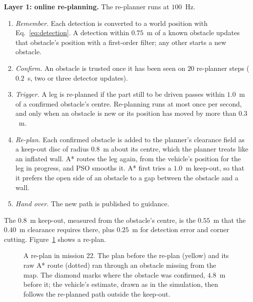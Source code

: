 \textbf{Layer 1: online re-planning.} The re-planner runs at $100$~Hz.
\begin{enumerate}
    \item \textit{Remember.} Each detection is converted to a world
    position with Eq.~\eqref{eq:detection}. A detection within $0.75$~m
    of a known obstacle updates that obstacle's position with a
    first-order filter; any other starts a new obstacle.
    \item \textit{Confirm.} An obstacle is trusted once it has been
    seen on $20$ re-planner steps ($0.2$~s, two or three detector updates).
    \item \textit{Trigger.} A leg is re-planned if the part still to be
    driven passes within $1.0$~m of a confirmed obstacle's centre. Re-planning
    runs at most once per second, and only when an obstacle is new or
    its position has moved by more than $0.3$~m.
    \item \textit{Re-plan.} Each confirmed obstacle is added to the
    planner's clearance field as a keep-out disc of radius $0.8$~m about
    its centre, which the planner treats like an inflated wall. A*
    routes the leg again, from the vehicle's position for the leg in
    progress, and PSO smooths it. A* first tries a $1.0$~m keep-out, so
    that it prefers the open side of an obstacle to a gap between the
    obstacle and a wall.
    \item \textit{Hand over.} The new path is published to guidance.
\end{enumerate}
The $0.8$~m keep-out, measured from the obstacle's centre, is the
$0.55$~m that the $0.40$~m clearance requires there, plus $0.25$~m for
detection error and corner cutting.
Figure~\ref{fig:replan} shows a re-plan.

\begin{figure}[!t]
    \centering
    \caption{A re-plan in mission 22. The plan before the re-plan
    (yellow) and its raw A* route (dotted) ran through an obstacle
    missing from the map. The diamond marks where the obstacle was
    confirmed, $4.8$~m before it; the vehicle's estimate, drawn as in the
    simulation, then follows the re-planned path outside the keep-out.}
    \label{fig:replan}
\end{figure}

